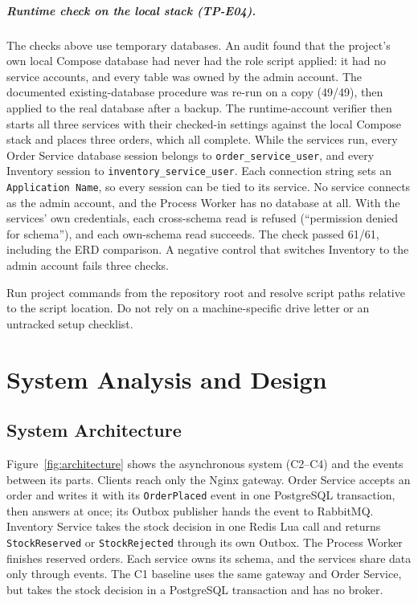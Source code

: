 \documentclass[a4paper]{report}
\begin{document}
\paragraph{Runtime check on the local stack (TP-E04).} The checks above use
temporary databases. An audit found that the project's own local
Compose database had never had the role script applied: it had no service
accounts, and every table was owned by the admin account. The documented
existing-database procedure was re-run on a copy (49/49), then applied to the
real database after a backup. The runtime-account verifier then starts
all three services with their checked-in settings against the
local Compose stack and places three orders, which all complete. While the
services run, every Order Service database session belongs to
\texttt{order\_service\_user}, and every Inventory session to
\texttt{inventory\_service\_user}. Each connection string sets an
\texttt{Application Name}, so every session can be tied to its service. No
service connects as the admin account, and the Process Worker has no database
at all. With the services' own credentials, each cross-schema read is refused
(``permission denied for schema''), and each own-schema read succeeds. The
check passed 61/61, including the ERD comparison. A negative control that
switches Inventory to the admin account fails three checks.

Run project commands from the repository root and resolve script paths relative to
the script location. Do not rely on a machine-specific drive letter or an
untracked setup checklist.

\chapter{System Analysis and Design}
\label{sec:design}

\section{System Architecture}
\label{sec:architecture}
Figure~\ref{fig:architecture} shows the asynchronous system (C2--C4) and the
events between its parts. Clients reach only the Nginx gateway. Order Service
accepts an order and writes it with its \texttt{OrderPlaced} event in one
PostgreSQL transaction, then answers at once; its Outbox publisher hands the
event to RabbitMQ. Inventory Service takes the stock decision in one Redis Lua
call and returns \texttt{StockReserved} or \texttt{StockRejected} through its
own Outbox. The Process Worker finishes reserved orders. Each service owns its
schema, and the services share data only through events. The C1 baseline uses
the same gateway and Order Service, but takes the stock decision in a
PostgreSQL transaction and has no broker.
\end{document}
